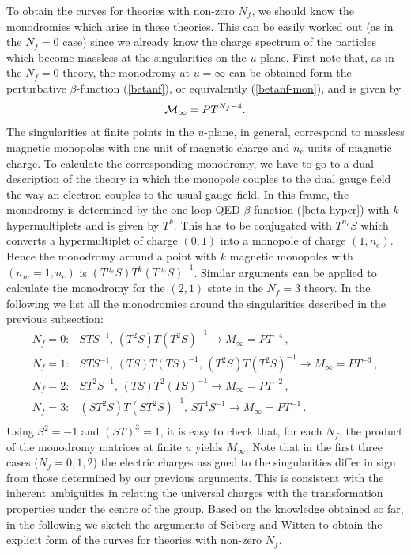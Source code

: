 To obtain the curves for theories with non-zero $N_f$, we should know
the monodromies which arise in these theories. This can be easily
worked out (as in the $N_f=0$ case) since we already know the charge
spectrum of the particles which become massless at the singularities
on the $u$-plane. First note that, as in the $N_f=0$ theory, the
monodromy at $u=\infty$ can be obtained form the perturbative
$\beta$-function (\ref{betanf}), or equivalently (\ref{betanf-mon}),
and is given by 
$$
{\cal M}_{\infty} = PT^{N_f -4}.
$$
The singularities at finite points in the $u$-plane, in general,
correspond to massless magnetic monopoles with one unit of magnetic
charge and $n_e$ units of magnetic charge. To calculate the
corresponding monodromy, we have to go to a dual description of the
theory in which the monopole couples to the dual gauge field the way
an electron couples to the usual gauge field. 
In this frame, the monodromy is determined by the one-loop QED 
$\beta$-function (\ref{beta-hyper}) with $k$ hypermultiplets and is
given by $T^k$. This has to be conjugated with $T^{n_e}S$ which
converts a hypermultiplet of charge $(0,1)$ into a monopole of charge
$(1,n_e)$. Hence the monodromy around a point with $k$ magnetic
monopoles with $(n_m = 1, n_e)$ is $(T^{n_e}S) T^k (T^{n_e}S)^{-1}$.  
Similar arguments can be applied to calculate the monodromy for the
$(2,1)$ state in the $N_f = 3$ theory. In the following we list
all the monodromies around the singularities described in the previous
subsection: 
$$     
\begin{array}{rl}
N_f=0:& STS^{-1},\,(T^2 S)T(T^2 S)^{-1}\rightarrow M_{\infty}=PT^{-4}\,,\\
N_f=1:& STS^{-1},\,(TS)T(TS)^{-1},\, (T^2S)T(T^2S)^{-1} \rightarrow
M_{\infty}=PT^{-3}\,, \\
N_f=2:& ST^2 S^{-1},\,(TS)T^2(TS)^{-1}\rightarrow M_{\infty}=PT^{-2}\,,\\
N_f=3:& (ST^2S)T(ST^2S)^{-1},\,ST^4 S^{-1}\rightarrow
M_{\infty}=PT^{-1}\,. \\
\end{array}
$$
Using $S^2=-1$ and $(ST)^3=1$, it is easy to check that, for each
$N_f$, the product of the monodromy matrices at finite $u$ yields
$M_{\infty}$.  Note that in the first three cases ($N_f =
0,1,2$) the electric charges assigned to the singularities differ in
sign from those determined by our previous arguments.  This is
consistent with the inherent ambiguities in relating the universal
charges with the transformation properties under the centre of the
group. Based on the knowledge obtained so far, in the following we
sketch the arguments of Seiberg and Witten to obtain the explicit form
of the curves for theories with non-zero $N_f$.

